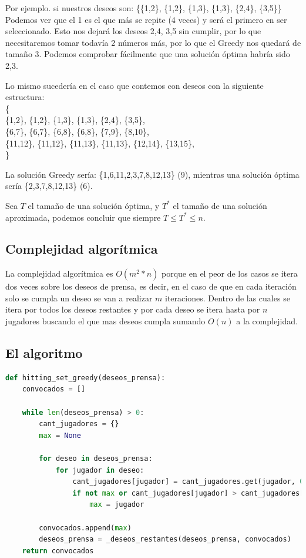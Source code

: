 \documentclass{estilo}
\begin{document}
Por ejemplo. si nuestros deseos son: \{\{1,2\}, \{1,2\}, \{1,3\}, \{1,3\}, \{2,4\}, \{3,5\}\}
Podemos ver que el 1 es el que más se repite (4 veces) y será el primero en ser seleccionado.
Esto nos dejará los deseos {{2,4}, {3,5}} sin cumplir, por lo que necesitaremos tomar todavía 2 números más, por lo que el Greedy nos quedará de tamaño 3. Podemos comprobar fácilmente que una solución óptima habría sido {2,3}.

Lo mismo sucedería en el caso que contemos con deseos con la siguiente estructura:
\\\{
\\\{1,2\}, \{1,2\}, \{1,3\}, \{1,3\}, \{2,4\}, \{3,5\},
\\\{6,7\}, \{6,7\}, \{6,8\}, \{6,8\}, \{7,9\}, \{8,10\},
\\\{11,12\}, \{11,12\}, \{11,13\}, \{11,13\}, \{12,14\}, \{13,15\},
\\\}

La solución Greedy sería: \{1,6,11,2,3,7,8,12,13\} (9), mientras una solución óptima sería \{2,3,7,8,12,13\} (6).

Sea $T$ el tamaño de una solución óptima, y $T^*$ el tamaño de una solución aproximada, podemos concluir que siempre $T \le T^* \le n$.


\subsection{Complejidad algorítmica}

La complejidad algorítmica es $O(m^2 * n)$ porque en el peor de los casos se itera dos veces sobre los deseos de prensa, es decir, en el caso de que en cada iteración solo se cumpla un deseo se van a realizar $m$ iteraciones. Dentro de las cuales se itera por todos los deseos restantes y por cada deseo se itera hasta por $n$ jugadores buscando el que mas deseos cumpla sumando $O(n)$ a la complejidad.

\subsection{El algoritmo}

\begin{lstlisting}[language=Python]
def hitting_set_greedy(deseos_prensa):
    convocados = []

    while len(deseos_prensa) > 0:
        cant_jugadores = {}
        max = None
        
        for deseo in deseos_prensa:
            for jugador in deseo:
                cant_jugadores[jugador] = cant_jugadores.get(jugador, 0) + 1
                if not max or cant_jugadores[jugador] > cant_jugadores[max]:
                    max = jugador
                    
        convocados.append(max)
        deseos_prensa = _deseos_restantes(deseos_prensa, convocados)
    return convocados
\end{lstlisting}
\end{document}
